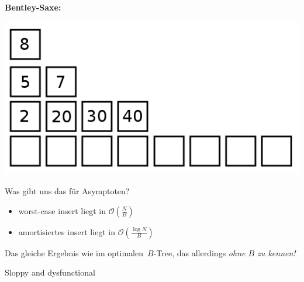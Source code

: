 \documentclass{beamer}
\begin{document}
\begin{frame}
\textbf{Bentley-Saxe:}
\begin{center}
\includegraphics[scale=0.25]{bentley_saxe_05.png} 
\end{center}

Was gibt uns das für Asymptoten?\bigskip

\begin{itemize}
\item worst-case insert liegt in $\mathcal{O}(\frac{N}{B})$\pause
\item amortisiertes insert liegt in $\mathcal{O}(\frac{\log{}N}{B})$\pause
\end{itemize}

Das gleiche Ergebnis wie im \glqq optimalen\grqq\ $B$-Tree, das allerdings \emph{ohne $B$ zu kennen!}
\end{frame}


\begin{frame}
Sloppy and dysfunctional
\end{frame}

\end{document}
